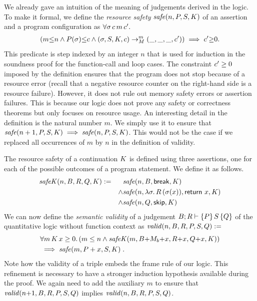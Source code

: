 \documentclass[nocopyrightspace,preprint,pldi]{sigplanconf-pldi15}
\begin{document}
{We already gave an intuition of the meaning of judgements
derived in the logic.  To make it formal, we define the
\emph{resource safety} $\mathit{safe}(n,P,S,K)$ of an assertion
and a program configuration as $\forall \sigma \, c \, m \, c' .$
\begin{align*}
  (m {\le} n \land P(\sigma) {\le} c \land
    (\sigma, S, K, c) \to_{M}^m (\_, \_, \_, c'))
  \implies c' {\ge} 0.
\end{align*}
This predicate is step indexed by an integer $n$ that is used for
induction in the soundness proof for the function-call and loop cases.
The constraint $c' \geq 0$ imposed by the definition ensures that
the program does not stop because of a resource error (recall that a
negative resource counter on the right-hand side is a resource
failure).  However, it does not rule out memory safety errors or
assertion failures. This is because our logic does not prove any
safety or correctness theorems but only focuses on resource usage.
%
An interesting detail in the definition is the natural number $m$.  We
simply use it to ensure that $\mathit{safe}(n+1,P,S,K) \implies \mathit{safe}(n,P,S,K) $.  This would not be the case if we replaced all occurrences of
$m$ by $n$ in the definition of validity.

The resource safety of a continuation $K$ is defined using three
assertions, one for each of the possible outcomes of a program
statement.  We define it as follows.
\begin{align*}
\mathit{safeK}(n,B,R,Q,K) & := & & \mathit{safe}(n,B,\mathsf{break},K) \\
& & \land& \mathit{safe}(n,\lambda \sigma.\,R\,(\sigma(x)),\mathsf{return}~x,K) \\
& & \land& \mathit{safe}(n,Q,\mathsf{skip},K)
\end{align*}
%
We can now define the \emph{semantic validity} of a judgement $B; R
\vdash \{P\}\, S\, \{Q\}$ of the quantitative logic without function
context as $\mathit{valid}(n,B,R,P,S,Q) :=$
\begin{align*}
& \forall m \, K \, x \geq 0 .\, (m \le n \land \mathit{safeK}(m,B{+}M_b{+}x,R{+}x,Q{+}x,K)) \\
& \implies \mathit{safe}(m,P+x,S,K) \; .
\end{align*}
Note how the validity of a triple embeds the frame rule of
our logic. This refinement is necessary to have a stronger
induction hypothesis available during the proof.
%
We again need to add the auxiliary $m$ to ensure that $\mathit{valid}(n{+}1,B,R,P,S,Q)$ implies $\mathit{valid}(n,B,R,P,S,Q)$.

}
\end{document}

